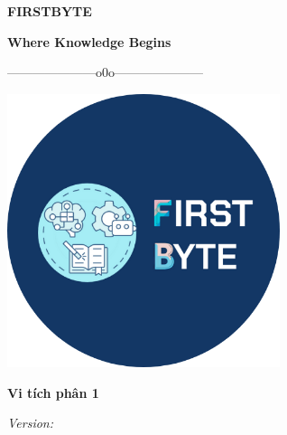 \begin{titlepage}
    \centering %

    \vspace*{2cm} %

    \textbf{\LARGE FIRSTBYTE} \\

    \vspace{0.5cm}
    
    \textbf{\Large Where Knowledge Begins}
    
    \vspace{1.5cm} %
    
    {\Large ---------------------o0o---------------------}
    
    \vspace{1.5cm}

    \includegraphics[width=0.6\textwidth]{figures/FirstByteLogoV2.png}
    
    \vspace{2cm}

    {\LARGE \textbf{Vi tích phân 1}}

    \vfill
    \large\textit{Version: \version}
\end{titlepage}
